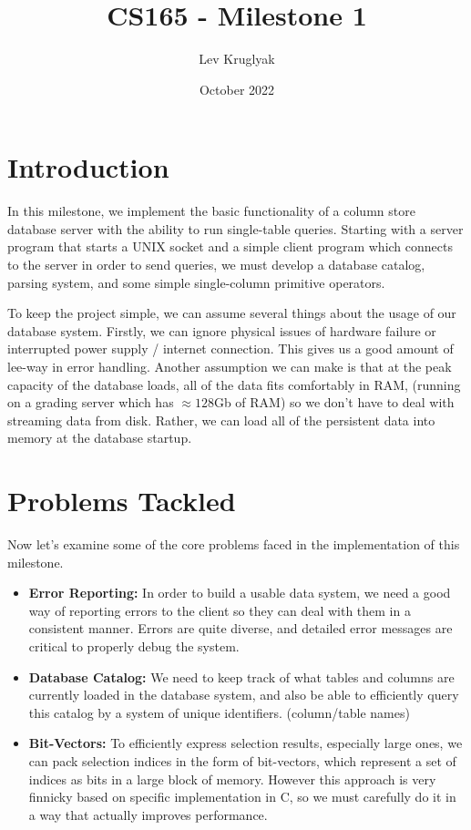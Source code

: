 \documentclass{article}
\title{\textbf{CS165 - Milestone 1}}
\author{Lev Kruglyak}
\date{October 2022}
\begin{document}
\maketitle

\section{Introduction}

In this milestone, we implement the basic functionality of a column store database server with the ability to run single-table queries. Starting with a server program that starts a UNIX socket and a simple client program which connects to the server in order to send queries, we must develop a database catalog, parsing system, and some simple single-column primitive operators.

\medskip
To keep the project simple, we can assume several things about the usage of our database system. Firstly, we can ignore physical issues of hardware failure or interrupted power supply / internet connection. This gives us a good amount of lee-way in error handling. Another assumption we can make is that at the peak capacity of the database loads, all of the data fits comfortably in RAM, (running on a grading server which has $\approx 128$Gb of RAM) so we don't have to deal with streaming data from disk. Rather, we can load all of the persistent data into memory at the database startup.

\section{Problems Tackled}

Now let's examine some of the core problems faced in the implementation of this milestone.

\begin{itemize}
    \item \textbf{Error Reporting:} In order to build a usable data system, we need a good way of reporting errors to the client so they can deal with them in a consistent manner. Errors are quite diverse, and detailed error messages are critical to properly debug the system.
    \item \textbf{Database Catalog:} We need to keep track of what tables and columns are currently loaded in the database system, and also be able to efficiently query this catalog by a system of unique identifiers. (column/table names)
    \item \textbf{Bit-Vectors:} To efficiently express selection results, especially large ones, we can pack selection indices in the form of bit-vectors, which represent a set of indices as bits in a large block of memory. However this approach is very finnicky based on specific implementation in C, so we must carefully do it in a way that actually improves performance.
\end{itemize}
\end{document}
